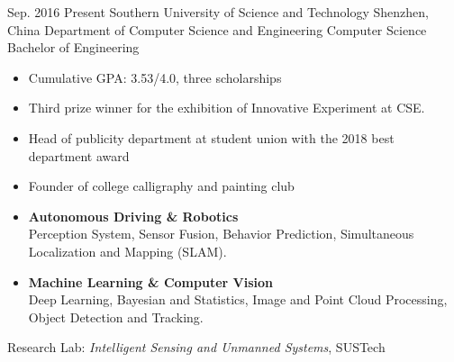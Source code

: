 \documentclass{resume}
\begin{document}
\makeheader

\begin{educations}
  \education%
    {Sep. 2016}%
    {Present}%
    {Southern University of Science and Technology}%
    {Shenzhen, China}%
    {Department of Computer Science and Engineering}%
    {Computer Science}%
    {Bachelor of Engineering}%
	{\begin{itemize}%
		\item Cumulative GPA: 3.53/4.0, three scholarships
		\item Third prize winner for the exhibition of Innovative Experiment at CSE.
		\item Head of publicity department at student union with the 2018 best department award
		\item Founder of college calligraphy and painting club
	\end{itemize}}%
\end{educations}
	
\begin{itemize}
  \item \textbf{Autonomous Driving \& Robotics}\\
  	Perception System, Sensor Fusion, Behavior Prediction, Simultaneous Localization and Mapping (SLAM).
  \item \textbf{Machine Learning \& Computer Vision}\\
  	Deep Learning, Bayesian and Statistics, Image and Point Cloud Processing, Object Detection and Tracking.
\end{itemize}


Research Lab: \textit{Intelligent Sensing and Unmanned Systems}, SUSTech
\end{document}
